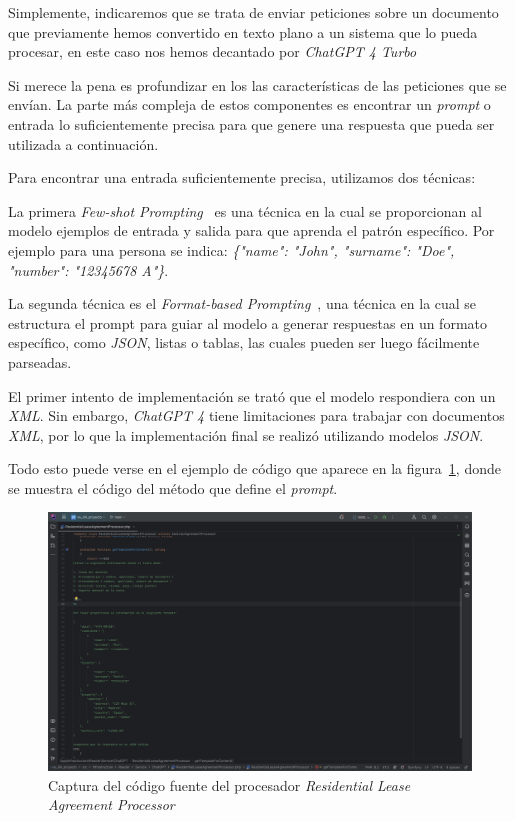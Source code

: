Simplemente, indicaremos que se trata de enviar peticiones sobre un documento que previamente hemos convertido en texto
plano a un sistema que lo pueda procesar, en este caso nos hemos decantado por \textit{ChatGPT 4 Turbo}~
\cite{url_openai_gpt4}

Si merece la pena es profundizar en los las características de las peticiones que se envían.
La parte más compleja de estos componentes es encontrar un \textit{prompt} o entrada lo suficientemente precisa para que
genere una respuesta que pueda ser utilizada a continuación.

Para encontrar una entrada suficientemente precisa, utilizamos dos técnicas:

La primera \textit{Few-shot Prompting}~\cite{article_few_shot_prompting} es una técnica en la cual se proporcionan
al modelo ejemplos de entrada y salida para que aprenda el patrón específico.
Por ejemplo para una persona se indica: \textit{\{"name": "John", "surname": "Doe", "number": "12345678 A"\}}.

La segunda técnica es el \textit{Format-based Prompting}~\cite{article_format_based_prompting}, una técnica en la
cual se estructura el prompt para guiar al modelo a generar respuestas en un formato específico, como \textit{JSON},
listas o tablas, las cuales pueden ser luego fácilmente parseadas.

El primer intento de implementación se trató que el modelo respondiera con un \textit{XML}.
Sin embargo, \textit{ChatGPT 4} tiene limitaciones para trabajar con documentos \textit{XML}, por lo que la
implementación final se realizó utilizando modelos \textit{JSON}.

Todo esto puede verse en el ejemplo de código que aparece en la
figura~\ref{fig:chapter_4.4.residential_lease_agreement_processor}, donde se muestra el código del método que define el
\textit{prompt}.

\begin{figure}[ht]
    \begin{center}
        \includegraphics[width=\textwidth]{./chapter/4/images/chapter_4.4.residential_lease_agreement_processor}
        \caption{Captura del código fuente del procesador \textit{Residential Lease Agreement Processor}}
        \label{fig:chapter_4.4.residential_lease_agreement_processor}
    \end{center}
\end{figure}

